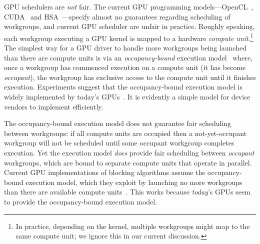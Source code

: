 \documentclass[parskip=half,sigconf,review, anonymous=true, acmcopyrightmode=none]{acmart}
\begin{document}
 GPU
schedulers are \emph{not} fair. The current GPU programming
models---OpenCL~\cite{opencl2Spec}, CUDA~\cite{cuda-75} and
HSA~\cite{HSAprogramming11}---specify almost no guarantees regarding
scheduling of workgroups, and current GPU scheduler are unfair in
practice.  Roughly speaking, each workgroup executing a GPU kernel is
mapped to a hardware \emph{compute unit}.\footnote{In practice,
  depending on the kernel, multiple workgroups might map to the same
  compute unit; we ignore this in our current discussion.}
%
The simplest way for a GPU driver to handle more workgroups being
launched than there are compute units is via an \emph{occupancy-bound}
execution
model~\cite{owens-persistent,DBLP:conf/oopsla/SorensenDBGR16} where,
once a workgroup has commenced execution on a compute unit (it has
become \emph{occupant}), the workgroup has exclusive access to the
compute unit until it finishes execution.  Experiments suggest that
the occupancy-bound execution model is widely implemented by today's
GPUs~\cite{owens-persistent,DBLP:conf/oopsla/SorensenDBGR16,DBLP:conf/oopsla/PaiP16,BNP12}.
It is evidently a simple model for device vendors to implement
efficiently.

The occupancy-bound execution model does not guarantee fair scheduling
between workgroups: if all compute units are occupied then a
not-yet-occupant workgroup will not be scheduled until some occupant
workgroup completes execution.  Yet the execution model \emph{does}
provide fair scheduling between \emph{occupant} workgroups, which are
bound to separate compute units that operate in parallel.  Current GPU
implementations of blocking algorithms assume the occupancy-bound
execution model, which they exploit by launching no more workgroups
than there are available compute units~\cite{owens-persistent}. This
works because \emph{today}'s GPUs seem to provide the occupancy-bound
execution model.
\end{document}
